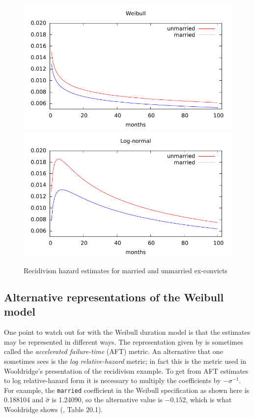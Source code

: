 \begin{figure}[htbp]
\centering
\includegraphics[scale=0.85]{figures/weibull}
\includegraphics[scale=0.85]{figures/lognorm}
\caption{Recidivism hazard estimates for married and unmarried
  ex-convicts}
\label{fig:hazard-plots}
\end{figure}

\subsection{Alternative representations of the Weibull model}

One point to watch out for with the Weibull duration model is that the
estimates may be represented in different ways.  The representation
given by  is sometimes called the \textit{accelerated
  failure-time} (AFT) metric. An alternative that one sometimes sees
is the \textit{log relative-hazard} metric; in fact this is the metric
used in Wooldridge's presentation of the recidivism example.  To get
from AFT estimates to log relative-hazard form it is necessary to
multiply the coefficients by $-\sigma^{-1}$. For example, the
\texttt{married} coefficient in the Weibull specification as shown
here is 0.188104 and $\hat{\sigma}$ is 1.24090, so the alternative
value is $-0.152$, which is what Wooldridge shows
(\citeyear{wooldridge-panel}, Table 20.1).

